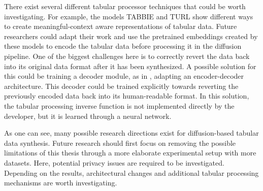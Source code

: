 There exist several different tabular processor techniques that could be worth investigating.
For example, the \glspl{model} TABBIE \cite{iida2021TABBIEPretrainedRepresentations} and TURL \cite{deng2021TURLTableUnderstanding} show different ways to create
meaningful-context aware representations of tabular data.
Future researchers could adapt their work and use the pretrained embeddings created by these \glspl{model} to encode the tabular data before processing it in the diffusion pipeline.
One of the biggest challenges here is to correctly revert the data back into its original data format after it has been synthesized.
A possible solution for this could be training a decoder module, as in \cite{rombach2022HighResolutionImageSynthesis}, adapting an encoder-decoder architecture.
This decoder could be trained explicitly towards reverting the previously encoded data back into its human-readable format.
In this solution, the tabular processing inverse function is not implemented directly by the developer, but it is learned through a neural network.

As one can see, many possible research directions exist for diffusion-based tabular data synthesis.
Future research should first focus on removing the possible limitations of this thesis through a more elaborate experimental setup with more datasets.
Here, potential privacy issues are required to be investigated.
Depending on the results, architectural changes and additional tabular processing mechanisms are worth investigating.